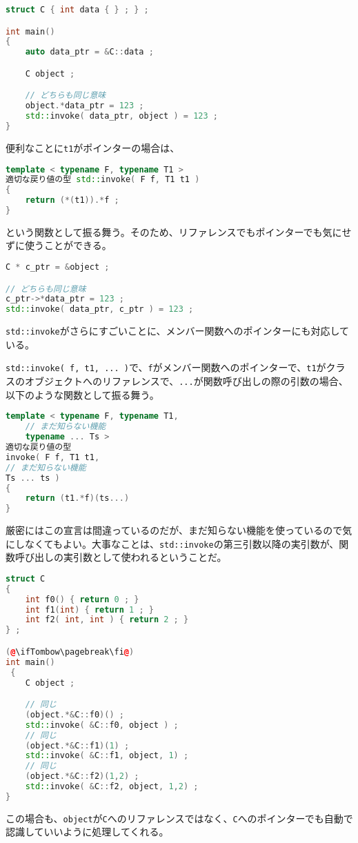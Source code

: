 \begin{lstlisting}[language={C++}]
struct C { int data { } ; } ;

int main()
{
    auto data_ptr = &C::data ;

    C object ;

    // どちらも同じ意味
    object.*data_ptr = 123 ;
    std::invoke( data_ptr, object ) = 123 ;
}
\end{lstlisting}

\ifTombow\pagebreak\fi
便利なことに\texttt{t1}がポインターの場合は、
\begin{lstlisting}[language={C++}]
template < typename F, typename T1 >
適切な戻り値の型 std::invoke( F f, T1 t1 )
{
    return (*(t1)).*f ;
}
\end{lstlisting}
という関数として振る舞う。そのため、リファレンスでもポインターでも気にせずに使うことができる。

\begin{lstlisting}[language={C++}]
C * c_ptr = &object ;

// どちらも同じ意味
c_ptr->*data_ptr = 123 ;
std::invoke( data_ptr, c_ptr ) = 123 ;
\end{lstlisting}

\texttt{std::invoke}がさらにすごいことに、メンバー関数へのポインターにも対応している。

\texttt{std::invoke( f, t1, ... )}で、\texttt{f}がメンバー関数へのポインターで、\texttt{t1}がクラスのオブジェクトへのリファレンスで、\texttt{...}が関数呼び出しの際の引数の場合、以下のような関数として振る舞う。

\begin{lstlisting}[language={C++}]
template < typename F, typename T1,
    // まだ知らない機能
    typename ... Ts >
適切な戻り値の型
invoke( F f, T1 t1,
// まだ知らない機能
Ts ... ts )
{
    return (t1.*f)(ts...)
}
\end{lstlisting}

厳密にはこの宣言は間違っているのだが、まだ知らない機能を使っているので気にしなくてもよい。大事なことは、\texttt{std::invoke}の第三引数以降の実引数が、関数呼び出しの実引数として使われるということだ。

\begin{lstlisting}[language={C++}]
struct C
{
    int f0() { return 0 ; }
    int f1(int) { return 1 ; } 
    int f2( int, int ) { return 2 ; }
} ;

(@\ifTombow\pagebreak\fi@)
int main()
 {
    C object ;

    // 同じ
    (object.*&C::f0)() ;
    std::invoke( &C::f0, object ) ;
    // 同じ
    (object.*&C::f1)(1) ;
    std::invoke( &C::f1, object, 1) ;
    // 同じ
    (object.*&C::f2)(1,2) ;
    std::invoke( &C::f2, object, 1,2) ;
}
\end{lstlisting}

この場合も、\texttt{object}が\texttt{C}へのリファレンスではなく、\texttt{C}へのポインターでも自動で認識していいように処理してくれる。
